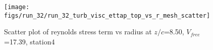 \begin{figure}[H]
\centering
\texttt{[image: figs/run\_32/run\_32\_turb\_visc\_ettap\_top\_vs\_r\_mesh\_scatter]}
\caption{Scatter plot of reynolds stress term vs radius at $z/c$=8.50, $V_{free}$=17.39, station4}
\label{fig:run_32_turb_visc_ettap_top_vs_r_mesh_scatter}
\end{figure}


